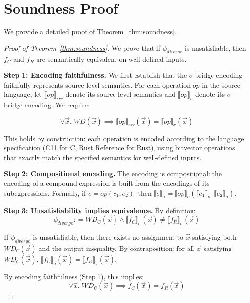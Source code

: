 \documentclass[10pt,letterpaper]{article}
\begin{document}
\appendix

\section{Soundness Proof}
\label{app:proof}

We provide a detailed proof of Theorem~\ref{thm:soundness}.

\begin{proof}[Proof of Theorem~\ref{thm:soundness}]
We prove that if $\phi_{\mathit{diverge}}$ is unsatisfiable, then
$f_C$ and $f_R$ are semantically equivalent on well-defined inputs.

\medskip
\noindent\textbf{Step 1: Encoding faithfulness.}
We first establish that the $\sigma$-bridge encoding faithfully represents
source-level semantics. For each operation $\mathit{op}$ in the source language,
let $\llbracket \mathit{op} \rrbracket_{\mathit{src}}$ denote its source-level
semantics and $\llbracket \mathit{op} \rrbracket_\sigma$ denote its $\sigma$-bridge
encoding. We require:

\begin{equation}
\forall \vec{x}.\; \mathit{WD}(\vec{x}) \implies
\llbracket \mathit{op} \rrbracket_{\mathit{src}}(\vec{x}) =
\llbracket \mathit{op} \rrbracket_\sigma(\vec{x})
\end{equation}

This holds by construction: each operation is encoded according to the language
specification (C11 for C, Rust Reference for Rust), using bitvector operations
that exactly match the specified semantics for well-defined inputs.

\medskip
\noindent\textbf{Step 2: Compositional encoding.}
The encoding is compositional: the encoding of a compound expression is built
from the encodings of its subexpressions. Formally, if $e = \mathit{op}(e_1, e_2)$,
then $\llbracket e \rrbracket_\sigma = \llbracket \mathit{op} \rrbracket_\sigma(
\llbracket e_1 \rrbracket_\sigma, \llbracket e_2 \rrbracket_\sigma)$.

\medskip
\noindent\textbf{Step 3: Unsatisfiability implies equivalence.}
By definition:
\begin{equation}
\phi_{\mathit{diverge}} \mathrel{{:}{=}}
  \mathit{WD}_C(\vec{x}) \wedge
  \llbracket f_C \rrbracket_\sigma(\vec{x}) \neq
  \llbracket f_R \rrbracket_\sigma(\vec{x})
\end{equation}

If $\phi_{\mathit{diverge}}$ is unsatisfiable, then there exists no assignment to
$\vec{x}$ satisfying both $\mathit{WD}_C(\vec{x})$ and the output inequality.
By contraposition: for all $\vec{x}$ satisfying $\mathit{WD}_C(\vec{x})$,
$\llbracket f_C \rrbracket_\sigma(\vec{x}) = \llbracket f_R \rrbracket_\sigma(\vec{x})$.

By encoding faithfulness (Step 1), this implies:
\begin{equation}
\forall \vec{x}.\; \mathit{WD}_C(\vec{x}) \implies f_C(\vec{x}) = f_R(\vec{x})
\end{equation}
\end{proof}
\end{document}
